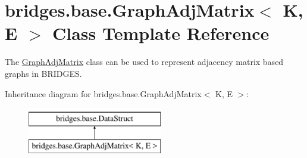 \hypertarget{classbridges_1_1base_1_1_graph_adj_matrix}{}\section{bridges.\+base.\+Graph\+Adj\+Matrix$<$ K, E $>$ Class Template Reference}
\label{classbridges_1_1base_1_1_graph_adj_matrix}


The \hyperlink{classbridges_1_1base_1_1_graph_adj_matrix}{Graph\+Adj\+Matrix} class can be used to represent adjacency matrix based graphs in B\+R\+I\+D\+G\+ES.  


Inheritance diagram for bridges.\+base.\+Graph\+Adj\+Matrix$<$ K, E $>$\+:\begin{figure}[H]
\begin{center}
\leavevmode
\includegraphics[height=2.000000cm]{classbridges_1_1base_1_1_graph_adj_matrix}
\end{center}
\end{figure}
